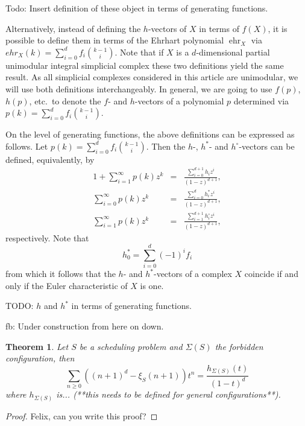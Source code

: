 \documentclass[12pt,reqno]{amsart}
\numberwithin{definition}{section}
\newtheorem{theorem}[definition]{Theorem}
\theoremstyle{definition}
\newcommand{\SSS}{\mathcal{S}}
\newcommand{\ehr}{\operatorname{ehr}}
\newcommand{\comment}[1]{\textsf{\footnotesize #1}}
\begin{document}
\comment{Todo: Insert definition of these object in terms of generating functions.}

Alternatively, instead of defining the $h$-vectors of $X$ in terms of $f(X)$, it is possible to define them in terms of the Ehrhart polynomial $\ehr_X$ via $ehr_X(k) = \sum_{i=0}^{d} f_i \binom{k-1}{i}$. Note that if $X$ is a $d$-dimensional partial unimodular integral simplicial complex these two definitions yield the same result. As all simplicial complexes considered in this article are unimodular, we will use both definitions interchangeably. In general, we are going to use $f(p)$, $h(p)$, etc.~to denote the $f$- and $h$-vectors of a polynomial $p$ determined via $p(k)=\sum_{i=0}^{d} f_i \binom{k-1}{i}$.

On the level of generating functions, the above definitions can be expressed as follows. Let $p(k)=\sum_{i=0}^{d} f_i \binom{k-1}{i}$. Then the $h$-, $h^*$- and $h^\circ$-vectors can be defined, equivalently, by 
\begin{eqnarray*}
1 + \sum_{i=1}^\infty p(k) z^k & = &  \frac{\sum_{i=0}^{d+1}h_i z^i}{(1-z)^{d+1}}, \\
\sum_{i=0}^\infty p(k) z^k & = &  \frac{\sum_{i=0}^{d}h^*_i z^i}{(1-z)^{d+1}}, \\
\sum_{i=1}^\infty p(k) z^k & = &  \frac{\sum_{i=1}^{d+1}h^\circ_i z^i}{(1-z)^{d+1}},
\end{eqnarray*}
respectively. Note that 
\[ 
h^*_0=\sum_{i=0}^d (-1)^i f_i
\]
from which it follows that the $h$- and $h^*$-vectors of a complex $X$ coincide if and only if the Euler characteristic of $X$ is one.


\comment{TODO: $h$ and $h^*$ in terms of generating functions.}

\comment{fb: Under construction from here on down.} 

\begin{theorem}
\label{Hilbert}
Let $S$ be a scheduling problem and $\Sigma(S)$ the forbidden configuration, then
$$ \sum_{n \geq 0} ((n+1)^d - \xi_S(n+1)) t^n = \frac{h_{\Sigma(S)}(t)}{(1-t)^d} $$
where $h_{\Sigma(S)}$ is... (**this needs to be defined for general configurations**).
\end{theorem}
\begin{proof}
Felix, can you write this proof?
\end{proof}
\end{document}
